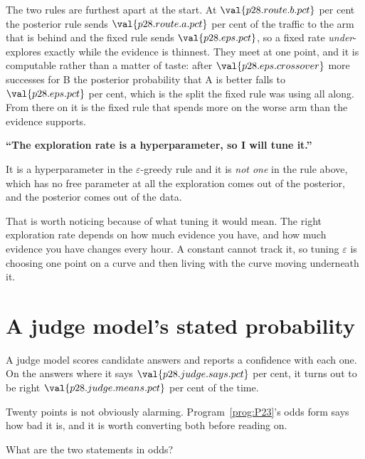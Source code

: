 \begin{fr}

The two rules are furthest apart at the start. At
$\val{p28.route.b.pct}$ per cent the posterior rule sends
$\val{p28.route.a.pct}$ per cent of the traffic to the arm that is behind
and the fixed rule sends $\val{p28.eps.pct}$, so a fixed rate
\emph{under}-explores exactly while the evidence is thinnest. They meet at
one point, and it is computable rather than a matter of taste: after
$\val{p28.eps.crossover}$ more successes for B the posterior probability
that A is better falls to $\val{p28.eps.pct}$ per cent, which is the split
the fixed rule was using all along. From there on it is the fixed rule that
spends more on the worse arm than the evidence supports.

\begin{trapbox}
\textbf{\enquote{The exploration rate is a hyperparameter, so I will tune
it.}}

It is a hyperparameter in the $\varepsilon$-greedy rule and it is \emph{not
one} in the rule above, which has no free parameter at all \dash{} the
exploration comes out of the posterior, and the posterior comes out of the
data.

That is worth noticing because of what tuning it would mean. The right
exploration rate depends on how much evidence you have, and how much evidence
you have changes every hour. A constant cannot track it, so tuning
$\varepsilon$ is choosing one point on a curve and then living with the curve
moving underneath it.
\end{trapbox}
\end{fr}

\section{A judge model's stated probability}
\label{sec:P28-judge}

\begin{fr}
A judge model scores candidate answers and reports a confidence with each
one. On the answers where it says $\val{p28.judge.says.pct}$ per cent, it
turns out to be right $\val{p28.judge.means.pct}$ per cent of the time.

Twenty points is not obviously alarming. Program~\ref{prog:P23}'s odds form
says how bad it is, and it is worth converting both before reading on.

What are the two statements in odds?
\dotline
\nextframe
\end{fr}

